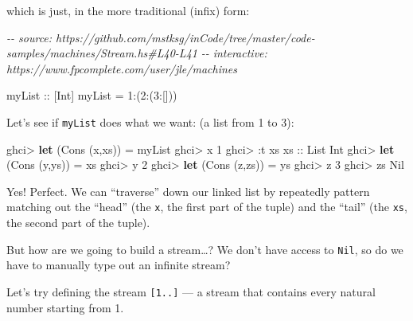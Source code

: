 \documentclass[]{article}
\newenvironment{Shaded}{}{}
\newcommand{\CommentTok}[1]{\textcolor[rgb]{0.38,0.63,0.69}{\textit{#1}}}
\newcommand{\DataTypeTok}[1]{\textcolor[rgb]{0.56,0.13,0.00}{#1}}
\newcommand{\DecValTok}[1]{\textcolor[rgb]{0.25,0.63,0.44}{#1}}
\newcommand{\KeywordTok}[1]{\textcolor[rgb]{0.00,0.44,0.13}{\textbf{#1}}}
\newcommand{\NormalTok}[1]{#1}
\newcommand{\OperatorTok}[1]{\textcolor[rgb]{0.40,0.40,0.40}{#1}}
\newcommand{\OtherTok}[1]{\textcolor[rgb]{0.00,0.44,0.13}{#1}}
\begin{document}
which is just, in the more traditional (infix) form:

\begin{Shaded}
\begin{Highlighting}[]
\CommentTok{{-}{-} source: https://github.com/mstksg/inCode/tree/master/code{-}samples/machines/Stream.hs\#L40{-}L41}
\CommentTok{{-}{-} interactive: https://www.fpcomplete.com/user/jle/machines}

\OtherTok{myList\textquotesingle{} ::}\NormalTok{ [}\DataTypeTok{Int}\NormalTok{]}
\NormalTok{myList\textquotesingle{} }\OtherTok{=} \DecValTok{1}\OperatorTok{:}\NormalTok{(}\DecValTok{2}\OperatorTok{:}\NormalTok{(}\DecValTok{3}\OperatorTok{:}\NormalTok{[]))}
\end{Highlighting}
\end{Shaded}

Let's see if \texttt{myList} does what we want: (a list from 1 to 3):

\begin{Shaded}
\begin{Highlighting}[]
\NormalTok{ghci}\OperatorTok{\textgreater{}} \KeywordTok{let}\NormalTok{ (}\DataTypeTok{Cons}\NormalTok{ (x,xs)) }\OtherTok{=}\NormalTok{ myList}
\NormalTok{ghci}\OperatorTok{\textgreater{}}\NormalTok{ x}
\DecValTok{1}
\NormalTok{ghci}\OperatorTok{\textgreater{}} \OperatorTok{:}\NormalTok{t xs}
\OtherTok{xs ::} \DataTypeTok{List} \DataTypeTok{Int}
\NormalTok{ghci}\OperatorTok{\textgreater{}} \KeywordTok{let}\NormalTok{ (}\DataTypeTok{Cons}\NormalTok{ (y,ys)) }\OtherTok{=}\NormalTok{ xs}
\NormalTok{ghci}\OperatorTok{\textgreater{}}\NormalTok{ y}
\DecValTok{2}
\NormalTok{ghci}\OperatorTok{\textgreater{}} \KeywordTok{let}\NormalTok{ (}\DataTypeTok{Cons}\NormalTok{ (z,zs)) }\OtherTok{=}\NormalTok{ ys}
\NormalTok{ghci}\OperatorTok{\textgreater{}}\NormalTok{ z}
\DecValTok{3}
\NormalTok{ghci}\OperatorTok{\textgreater{}}\NormalTok{ zs}
\DataTypeTok{Nil}
\end{Highlighting}
\end{Shaded}

Yes! Perfect. We can ``traverse'' down our linked list by repeatedly pattern
matching out the ``head'' (the \texttt{x}, the first part of the tuple) and the
``tail'' (the \texttt{xs}, the second part of the tuple).

But how are we going to build a stream\ldots? We don't have access to
\texttt{Nil}, so do we have to manually type out an infinite stream?

Let's try defining the stream \texttt{{[}1..{]}} --- a stream that contains
every natural number starting from 1.
\end{document}
